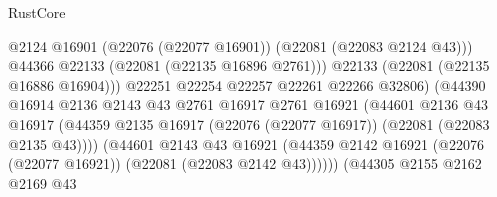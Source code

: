 \begin{lexlean}{RustCore}
\begin{coremodule}
                                                  @2124
                                                  @16901
                                                  (@22076 (@22077 @16901))
                                                  (@22081 (@22083 @2124 @43)))
                                                @44366
                                                @22133
                                                (@22081 (@22135 @16896 @2761)))
                                              @22133
                                              (@22081 (@22135 @16886 @16904)))
                                            @22251
                                            @22254
                                            @22257
                                            @22261
                                            @22266
                                            @32806)
                                          (@44390
                                            @16914
                                            @2136
                                            @2143
                                            @43
                                            @2761
                                            @16917
                                            @2761
                                            @16921
                                            (@44601
                                              @2136
                                              @43
                                              @16917
                                              (@44359
                                                @2135
                                                @16917
                                                (@22076 (@22077 @16917))
                                                (@22081 (@22083 @2135 @43))))
                                            (@44601
                                              @2143
                                              @43
                                              @16921
                                              (@44359
                                                @2142
                                                @16921
                                                (@22076 (@22077 @16921))
                                                (@22081 (@22083 @2142 @43))))))
                                        (@44305
                                          @2155
                                          @2162
                                          @2169
                                          @43

\end{coremodule}
\end{lexlean}
